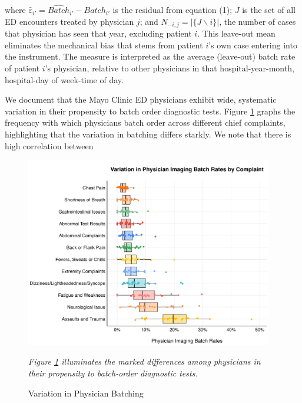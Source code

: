 \documentclass[,,nonblindrev]{informs}
\begin{document}
where \(\hat{\varepsilon}_{i'} = \hat{Batch}_{i'} - Batch_{i'}\) is the
residual from equation (1); \(J\) is the set of all ED encounters
treated by physician \(j\); and \(N_{-i,j} = |\{J \backslash i\}|\), the
number of cases that physician has seen that year, excluding patient
\(i\). This leave-out mean eliminates the mechanical bias that stems
from patient \(i\)'s own case entering into the instrument. The measure
is interpreted as the average (leave-out) batch rate of patient \(i\)'s
physician, relative to other physicians in that hospital-year-month,
hospital-day of week-time of day.

We document that the Mayo Clinic ED physicians exhibit wide, systematic
variation in their propensity to batch order diagnostic tests. Figure
\ref{fig:physician_batching} graphs the frequency with which physicians
batch order across different chief complaints, highlighting that the
variation in batching differs starkly. We note that there is high
correlation between

\begin{figure}[h]
  \centering
  \caption{Variation in Physician Batching}
  \label{fig:physician_batching}
  \includegraphics[width=4.25in]{../outputs/figures/Figure 1.png}
\begin{tablenotes}
\small
\item \textit{Figure \ref{fig:physician_batching} illuminates the marked differences among physicians in their propensity to batch-order diagnostic tests.}
\end{tablenotes}  
\end{figure}
\end{document}
